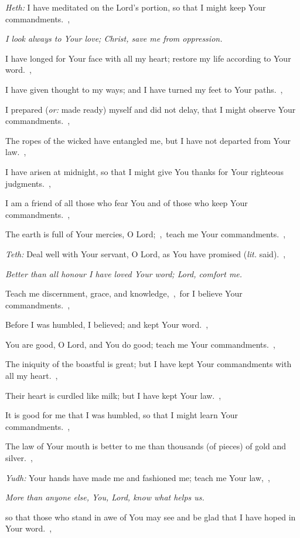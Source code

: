 \documentclass[12pt,twoside,a5paper]{article}
\newcommand{\qanona}[1]{{\liturgicalhint{Qanona.} \emph{#1}}}
\newcommand{\translationoption}[1]{\emph{or:} #1}
\newcommand{\translationliteral}[1]{\emph{lit.} #1}
\begin{document}
\begin{normalparskip}
  \emph{Heth:} I have meditated on the Lord's portion, so that I might keep Your commandments.~\sep

  \qanona{I look always to Your love; Christ, save me from oppression.}

  I have longed for Your face with all my heart; restore my life according to Your word.~\sep

  I have given thought to my ways; and I have turned my feet to Your paths.~\sep

  I prepared (\translationoption{made ready}) myself and did not delay, that I might observe Your commandments.~\sep

  The ropes of the wicked have entangled me, but I have not departed from Your law.~\sep

  I have arisen at midnight, so that I might give You thanks for Your righteous judgments.~\sep

  I am a friend of all those who fear You and of those who keep Your commandments.~\sep

  The earth is full of Your mercies, O Lord;~\sep\ teach me Your commandments.~\sep

  \emph{Teth:} Deal well with Your servant, O Lord, as You have promised (\translationliteral{said}).~\sep

  \qanona{Better than all honour I have loved Your word; Lord, comfort me.}

  Teach me discernment, grace, and knowledge,~\sep\ for I believe Your commandments.~\sep

  Before I was humbled, I believed; and kept Your word.~\sep

  You are good, O Lord, and You do good; teach me Your commandments.~\sep

  The iniquity of the boastful is great; but I have kept Your commandments with all my heart.~\sep

  Their heart is curdled like milk; but I have kept Your law.~\sep

  It is good for me that I was humbled, so that I might learn Your commandments.~\sep

  The law of Your mouth is better to me than thousands (of pieces) of gold and silver.~\sep

  \emph{Yudh:} Your hands have made me and fashioned me; teach me Your law,~\sep

  \qanona{More than anyone else, You, Lord, know what helps us.}

  so that those who stand in awe of You may see and be glad that I have hoped in Your word.~\sep


\end{normalparskip}
\end{document}
